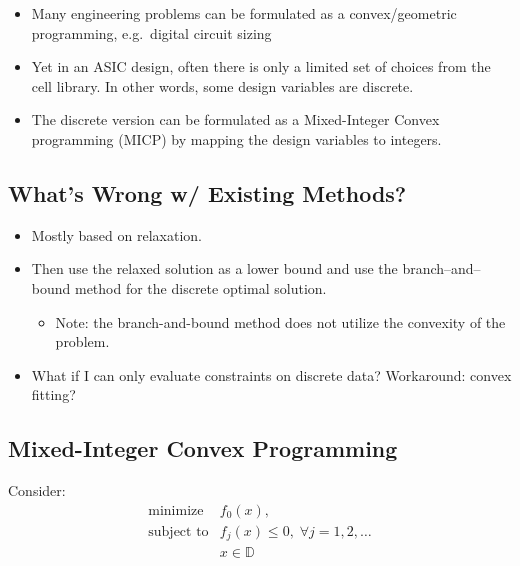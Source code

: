 \documentclass[]{article}
\providecommand{\tightlist}{%
  \setlength{\itemsep}{0pt}\setlength{\parskip}{0pt}}
\begin{document}
\begin{itemize}
\item
  Many engineering problems can be formulated as a convex/geometric
  programming, e.g.~digital circuit sizing
\item
  Yet in an ASIC design, often there is only a limited set of choices
  from the cell library. In other words, some design variables are
  discrete.
\item
  The discrete version can be formulated as a Mixed-Integer Convex
  programming (MICP) by mapping the design variables to integers.
\end{itemize}

\hypertarget{whats-wrong-w-existing-methods}{%
\subsection{What's Wrong w/ Existing
Methods?}\label{whats-wrong-w-existing-methods}}

\begin{itemize}
\item
  Mostly based on relaxation.
\item
  Then use the relaxed solution as a lower bound and use the
  branch--and--bound method for the discrete optimal solution.

  \begin{itemize}
  \tightlist
  \item
    Note: the branch-and-bound method does not utilize the convexity of
    the problem.
  \end{itemize}
\item
  What if I can only evaluate constraints on discrete data? Workaround:
  convex fitting?
\end{itemize}

\hypertarget{mixed-integer-convex-programming}{%
\subsection{Mixed-Integer Convex
Programming}\label{mixed-integer-convex-programming}}

Consider: \[\begin{array}{ll}
        \text{minimize}      & f_0(x), \\
        \text{subject to}    & f_j(x) \leq 0, \; \forall j=1,2,\ldots \\
                             & x \in \mathbb{D} 
\end{array}\]
\end{document}

